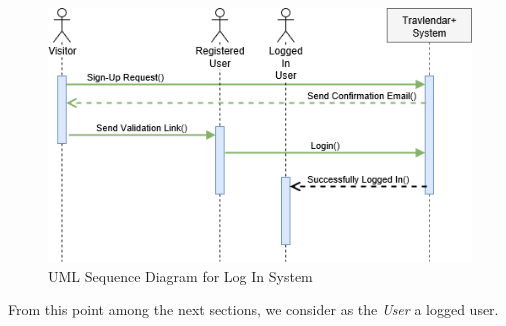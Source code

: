 \begin{figure}[H]
\centering
\includegraphics[scale=0.5]{Pictures/SequenceDiagram/login.png}
\caption{UML Sequence Diagram for Log In System}
\end{figure}

From this point among the next sections, we consider as the \emph{User} a logged user.